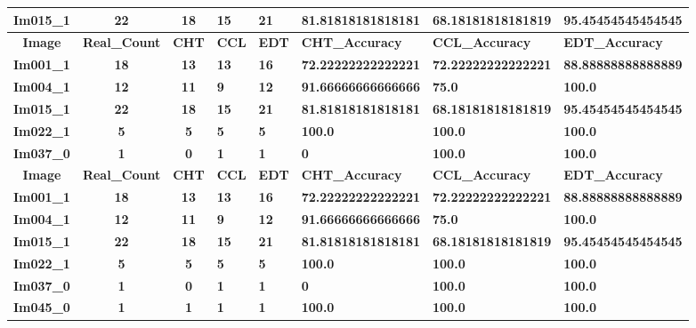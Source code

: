 \begin{table}[H]
\begin{tabular}{|c|c|c|}
 \textbf{Im015\_1} & \textbf{22} & \textbf{18} & \textbf{15} & \textbf{21} & \textbf{81.81818181818181} & \textbf{68.18181818181819} & \textbf{95.45454545454545} \\ \hline
 \textbf{Image} & \textbf{Real\_Count} & \textbf{CHT} & \textbf{CCL} & \textbf{EDT} & \textbf{CHT\_Accuracy} & \textbf{CCL\_Accuracy} & \textbf{EDT\_Accuracy} \\ \hline
 \textbf{Im001\_1} & \textbf{18} & \textbf{13} & \textbf{13} & \textbf{16} & \textbf{72.22222222222221} & \textbf{72.22222222222221} & \textbf{88.88888888888889} \\ \hline
 \textbf{Im004\_1} & \textbf{12} & \textbf{11} & \textbf{9} & \textbf{12} & \textbf{91.66666666666666} & \textbf{75.0} & \textbf{100.0} \\ \hline
 \textbf{Im015\_1} & \textbf{22} & \textbf{18} & \textbf{15} & \textbf{21} & \textbf{81.81818181818181} & \textbf{68.18181818181819} & \textbf{95.45454545454545} \\ \hline
 \textbf{Im022\_1} & \textbf{5} & \textbf{5} & \textbf{5} & \textbf{5} & \textbf{100.0} & \textbf{100.0} & \textbf{100.0} \\ \hline
 \textbf{Im037\_0} & \textbf{1} & \textbf{0} & \textbf{1} & \textbf{1} & \textbf{0} & \textbf{100.0} & \textbf{100.0} \\ \hline
 \textbf{Image} & \textbf{Real\_Count} & \textbf{CHT} & \textbf{CCL} & \textbf{EDT} & \textbf{CHT\_Accuracy} & \textbf{CCL\_Accuracy} & \textbf{EDT\_Accuracy} \\ \hline
 \textbf{Im001\_1} & \textbf{18} & \textbf{13} & \textbf{13} & \textbf{16} & \textbf{72.22222222222221} & \textbf{72.22222222222221} & \textbf{88.88888888888889} \\ \hline
 \textbf{Im004\_1} & \textbf{12} & \textbf{11} & \textbf{9} & \textbf{12} & \textbf{91.66666666666666} & \textbf{75.0} & \textbf{100.0} \\ \hline
 \textbf{Im015\_1} & \textbf{22} & \textbf{18} & \textbf{15} & \textbf{21} & \textbf{81.81818181818181} & \textbf{68.18181818181819} & \textbf{95.45454545454545} \\ \hline
 \textbf{Im022\_1} & \textbf{5} & \textbf{5} & \textbf{5} & \textbf{5} & \textbf{100.0} & \textbf{100.0} & \textbf{100.0} \\ \hline
 \textbf{Im037\_0} & \textbf{1} & \textbf{0} & \textbf{1} & \textbf{1} & \textbf{0} & \textbf{100.0} & \textbf{100.0} \\ \hline
 \textbf{Im045\_0} & \textbf{1} & \textbf{1} & \textbf{1} & \textbf{1} & \textbf{100.0} & \textbf{100.0} & \textbf{100.0} \\ \hline

\end{tabular}
\end{table}
